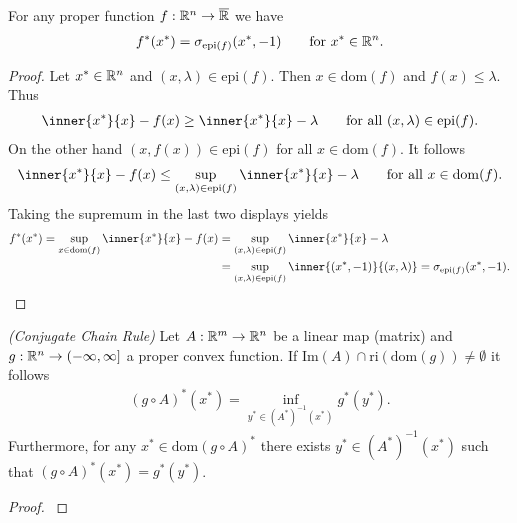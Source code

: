 \begin{lemma}
  For any proper function
  $
    f:\mathbb{R}^n\to\overline{\mathbb{R}}
  $
  we have
  \begin{gather}
    f^*(x^*) 
    =
    \sigma_{\mathrm{epi}(f)}
    (x^*,-1)
    \qquad
    \text{for}
    \ 
    x^* \in \R^n.
  \end{gather}
\end{lemma}
\begin{proof}
  Let $x^*\in\mathbb{R}^n$
  and
  $
    (x,\lambda)\in \mathrm{epi}(f).
  $
  Then
  $
    x \in \mathrm{dom}(f)
  $
  and
  $
    f(x)\le \lambda.
  $
  Thus
  \begin{gather}
    \inner{x^*}{x} - f(x)
    \ge
    \inner{x^*}{x} - \lambda
    \qquad
    \text{for all}\ 
    (x,\lambda)\in \mathrm{epi}(f).
  \end{gather}
  On the other hand 
  $
    (x,f(x))\in \mathrm{epi}(f)
  $
  for all
  $
    x \in \mathrm{dom}(f).
  $
  It follows
  \begin{gather}
    \inner{x^*}{x} - f(x)
    \le
    \sup_{(x,\lambda)\in\mathrm{epi}(f)}
    \inner{x^*}{x} - \lambda
    \qquad
    \text{for all}\ 
    x \in \mathrm{dom}(f).
  \end{gather}
  Taking the supremum in the last two displays yields
  \begin{align}
    f^*(x^*)
    =
    \sup_{x\in\mathrm{dom}(f)}
    \inner{x^*}{x} - f(x)
    &=
    \sup_{(x,\lambda)\in\mathrm{epi}(f)}
    \inner{x^*}{x} - \lambda
    \\
    &=
    \sup_{(x,\lambda)\in\mathrm{epi}(f)}
    \inner{(x^*,-1)}{(x,\lambda)} 
    =
    \sigma_{\mathrm{epi}(f)}
    (x^*,-1).
  \end{align}
\end{proof}
\begin{theorem}
  \emph{(Conjugate Chain Rule)}
  \label{cvxa_conjugate_chain_rule}
  Let 
  $
    A:
      \mathbb{R}^m \to \mathbb{R}^n
  $
  be a linear map (matrix)
  and
  $
    g:
      \mathbb{R}^n \to (-\infty, \infty]
  $
  a proper convex function. If
  $
    \text{Im}(A) \cap \text{ri}(\text{dom}(g))
    \neq
    \emptyset
  $
  it follows
  \begin{gather}
    ( g \circ A )^* ( x^* )
    =
    \inf_
          { y^* \in ( A^* )^{ -1 } ( x^* )}
                                          g^*( y^* )
                                          .
  \end{gather}
  Furthermore, 
    for any 
      $
        x^* \in \text{dom}( g \circ A)^*
      $
        there exists
          $
            y^* \in ( A^* )^{ -1 } ( x^* )
          $
            such that
              $
                ( g \circ A)^* ( x^* )
                =
                g^*( y^* )
              $.
\end{theorem}
\begin{proof}
  \cite[Proposition~4.28]{Mordukhovich2022}
\end{proof}

